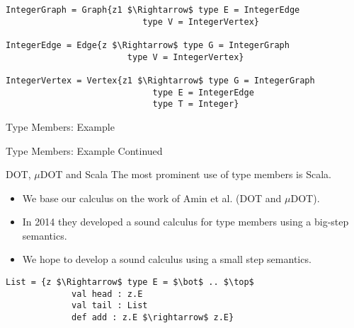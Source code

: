 \documentclass[dvipsnames]{beamer}
\begin{document}
\begin{lrbox}{\tmExAcont}
\begin{lstlisting}[mathescape, style=customlang]		      
IntegerGraph = Graph{z1 $\Rightarrow$ type E = IntegerEdge
                           type V = IntegerVertex}
		
IntegerEdge = Edge{z $\Rightarrow$ type G = IntegerGraph
                        type V = IntegerVertex}
		
IntegerVertex = Vertex{z1 $\Rightarrow$ type G = IntegerGraph
                             type E = IntegerEdge
                             type T = Integer}
\end{lstlisting}
\end{lrbox}

\begin{frame}{Type Members: Example}
\begin{example}
\usebox{\tmExA}
\end{example}
\end{frame}

\begin{frame}{Type Members: Example Continued}
\begin{example}
\usebox{\tmExAcont}
\end{example}
\end{frame}


\begin{frame}{DOT, $\mu$DOT and Scala}
The most prominent use of type members is Scala. 
\begin{itemize}
\item
We base our calculus on the work of Amin et al. (DOT and $\mu$DOT).
\item
In 2014 they developed a sound calculus for type members using a big-step semantics.
\item
We hope to develop a sound calculus using a small step semantics.
\end{itemize}
\end{frame}

\begin{lrbox}{\tmExWyvern}
\begin{lstlisting}[mathescape, style=customlang]	
List = {z $\Rightarrow$ type E = $\bot$ .. $\top$
             val head : z.E
             val tail : List
             def add : z.E $\rightarrow$ z.E}
\end{lstlisting}
\end{lrbox}
\end{document}
